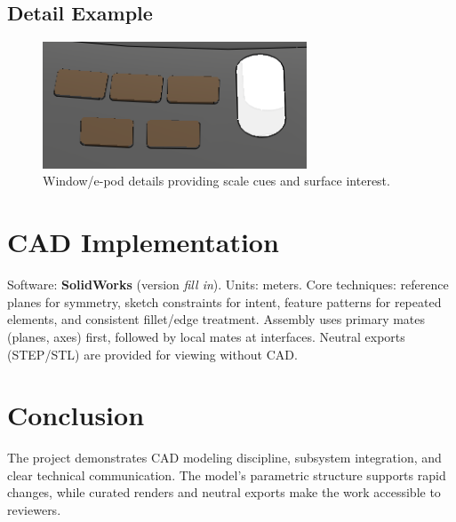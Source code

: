 \documentclass[12pt]{article}
\begin{document}
\subsection*{Detail Example}
\begin{figure}[H]
    \centering
    \includegraphics[width=0.7\textwidth]{windows_epods.png}
    \caption{Window/e-pod details providing scale cues and surface interest.}
\end{figure}

\section*{CAD Implementation}
Software: \textbf{SolidWorks} (version \emph{fill in}). Units: meters. Core techniques:
reference planes for symmetry, sketch constraints for intent, feature patterns for
repeated elements, and consistent fillet/edge treatment. Assembly uses primary mates
(planes, axes) first, followed by local mates at interfaces. Neutral exports (STEP/STL)
are provided for viewing without CAD.

\section*{Conclusion}
The project demonstrates CAD modeling discipline, subsystem integration, and clear
technical communication. The model’s parametric structure supports rapid changes,
while curated renders and neutral exports make the work accessible to reviewers.
\end{document}
